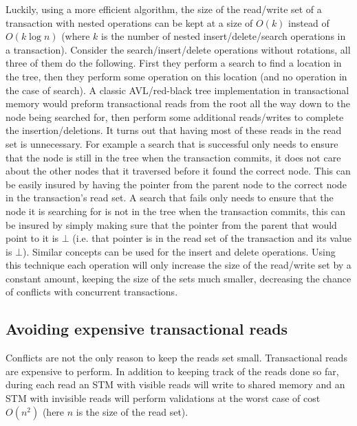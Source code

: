 \documentclass[10pt]{sigplanconf}
\begin{document}
Luckily, using a more efficient algorithm, the size of the read/write set of a transaction with nested operations
can be kept at a size of $O(k)$ instead of $O(k\log{n})$ (where $k$ is the number of nested insert/delete/search operations in a transaction).
Consider the search/insert/delete operations without rotations, all three of them do the following.
First they perform a search to find a location in the tree, then they perform some operation on this location (and no operation in the case of search).
A classic AVL/red-black tree implementation in transactional memory would preform transactional reads from the root all the way down to the node being searched for, then perform some additional reads/writes to complete the insertion/deletions.
It turns out that having most of these reads in the read set is unnecessary.
For example a search that is successful only needs to ensure that the node is still in the tree when the transaction commits, it does not care about the other nodes that it traversed before it found the correct node.
This can be easily insured by having the pointer from the parent node to the correct node in the transaction's read set.
A search that fails only needs to ensure that the node it is searching for is not in the tree when the transaction commits, this can be insured by simply making sure that the pointer from the parent that would point to it is $\bot$
(i.e. that pointer is in the read set of the transaction and its value is $\bot$).
Similar concepts can be used for the insert and delete operations.
Using this technique each operation will only increase the size of the read/write set by a constant amount, keeping the size of the sets much smaller, decreasing the chance of conflicts with concurrent transactions.

\subsection{Avoiding expensive transactional reads}
Conflicts are not the only reason to keep the reads set small.
Transactional reads are expensive to perform.
In addition to keeping track of the reads done so far, during each read an STM with visible reads will write to shared memory
and an STM with invisible reads will perform validations at the worst case of cost $O(n^2)$ 
(here $n$ is the size of the read set).
\end{document}
